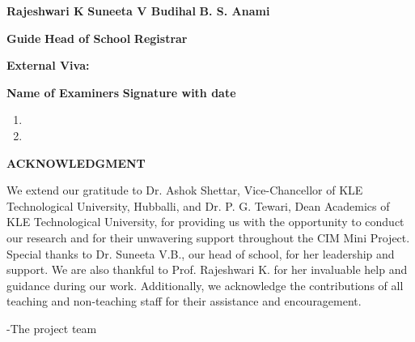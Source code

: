 \documentclass[12 pt]{report}
\begin{document}
\vspace{2cm}
\begin{small} \textbf{Rajeshwari K} \hspace{2cm} \textbf{ Suneeta V Budihal} \hspace{2.8cm} \textbf{ B. S. Anami} \linebreak
\end{small}
\vspace{1cm}
\hspace{1cm} \small{\textbf{Guide} \hspace{4cm} \textbf{Head of School} \hspace{4cm}  \textbf{Registrar}}


\vspace{0.8cm}

\begin{flushleft}
  \textbf{External Viva: \\}
\end{flushleft}
\textbf{Name of Examiners} \hspace{8cm} \textbf{Signature with date}
\begin{enumerate}
  \item
  \item
\end{enumerate}

\newpage
\begin{center}
  \begin{Large}
    \textbf{ACKNOWLEDGMENT}
  \end{Large}
\end{center}
We extend our gratitude to Dr. Ashok Shettar, Vice-Chancellor of KLE Technological University, Hubballi, and Dr. P. G. Tewari, Dean Academics of KLE Technological University, for providing us with the opportunity to conduct our research and for their unwavering support throughout the CIM Mini Project. Special thanks to Dr. Suneeta V.B., our head of school, for her leadership and support. We are also thankful to Prof. Rajeshwari K. for her invaluable help and guidance during our work. Additionally, we acknowledge the contributions of all teaching and non-teaching staff for their assistance and encouragement.

\flushright
-The project team
\flushleft
\end{document}

